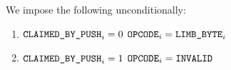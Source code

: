 We impose the following unconditionally:
\begin{enumerate}
        \item \If $\texttt{CLAIMED\_BY\_PUSH}_{i} = 0$ \Then $\texttt{OPCODE}_{i} = \texttt{LIMB\_BYTE}_{i}$
        \item \If $\texttt{CLAIMED\_BY\_PUSH}_{i} = 1$ \Then $\texttt{OPCODE}_{i} = \texttt{INVALID}$
\end{enumerate}
